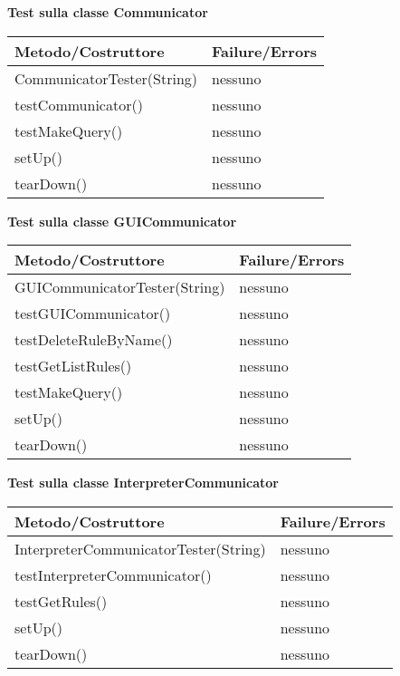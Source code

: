 \begin{center}
\textbf{Test sulla classe Communicator}\\
\begin{tabular}{|p{}|p{3 cm}|} \hline
\textbf{Metodo/Costruttore} & \textbf{Failure/Errors} \\ \hline
CommunicatorTester(String) & nessuno \\ \hline
testCommunicator() & nessuno \\ \hline
testMakeQuery() & nessuno \\ \hline
setUp() & nessuno \\ \hline
tearDown() & nessuno \\ \hline
\end{tabular}
\end{center}

\begin{center}
\textbf{Test sulla classe GUICommunicator}\\
\begin{tabular}{|p{}|p{3 cm}|} \hline
\textbf{Metodo/Costruttore} & \textbf{Failure/Errors} \\ \hline
GUICommunicatorTester(String) & nessuno \\ \hline
testGUICommunicator() & nessuno \\ \hline
testDeleteRuleByName() & nessuno \\ \hline
testGetListRules() & nessuno \\ \hline
testMakeQuery() & nessuno \\ \hline
setUp() & nessuno \\ \hline
tearDown() & nessuno \\ \hline
\end{tabular}
\end{center}

\begin{center}
\textbf{Test sulla classe InterpreterCommunicator}\\
\begin{tabular}{|p{}|p{3 cm}|} \hline
\textbf{Metodo/Costruttore} & \textbf{Failure/Errors} \\ \hline
InterpreterCommunicatorTester(String) & nessuno \\ \hline
testInterpreterCommunicator() & nessuno \\ \hline
testGetRules() & nessuno \\ \hline
setUp() & nessuno \\ \hline
tearDown() & nessuno \\ \hline
\end{tabular}
\end{center}

